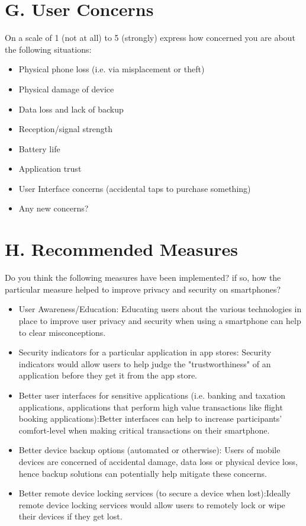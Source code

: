 \documentclass{sigchi}
\begin{document}
\section{G. User Concerns}
On a scale of 1 (not at all) to 5 (strongly) express how concerned you are about the following situations:
\begin{itemize}
\item Physical phone loss (i.e. via misplacement or theft)
\item Physical damage of device
\item Data loss and lack of backup
\item Reception/signal strength
\item Battery life
\item Application trust
\item User Interface concerns (accidental taps to purchase something)
\item Any new concerns?
\end{itemize}
\section{H. Recommended Measures }
Do you think the following measures have been implemented? if so, how the particular measure helped to improve privacy and security on smartphones?
\begin{itemize}
\item User Awareness/Education: Educating users about the various technologies in place to improve user privacy and security when using a smartphone can help to clear misconceptions.
\item Security indicators for a particular application in app stores: Security indicators would allow users to help judge the "trustworthiness" of an application before they get it from the app store.
\item Better user interfaces for sensitive applications (i.e. banking and taxation applications, applications that perform high value transactions like flight booking applications):Better interfaces can help to increase participants' comfort-level when making critical transactions on their smartphone.
\item Better device backup options (automated or otherwise): Users of mobile devices are concerned of accidental damage, data loss or physical device loss, hence backup solutions can potentially help mitigate these concerns.
\item Better remote device locking services (to secure a device when lost):Ideally remote device locking services would allow users to remotely lock or wipe their devices if they get lost.

\end{itemize}
 
\end{document}
